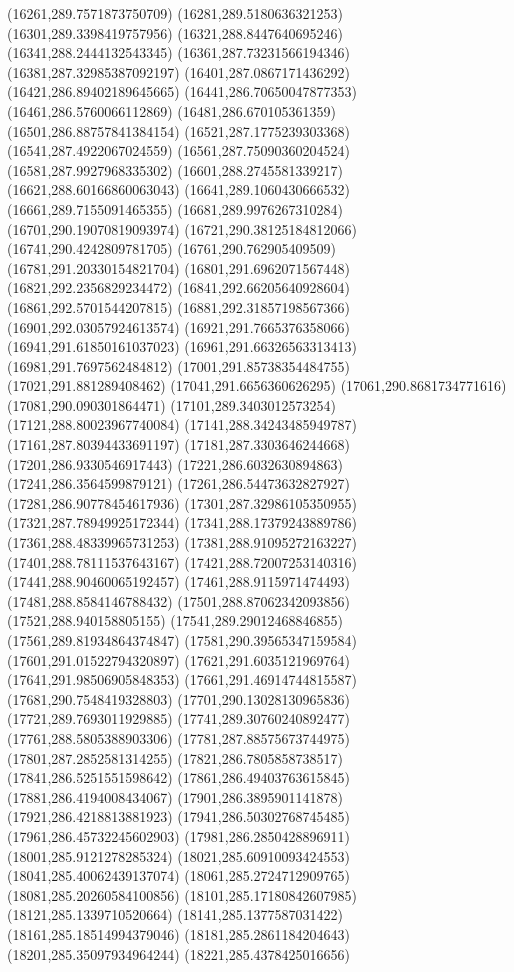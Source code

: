 {(16261,289.7571873750709)
(16281,289.5180636321253)
(16301,289.3398419757956)
(16321,288.8447640695246)
(16341,288.2444132543345)
(16361,287.73231566194346)
(16381,287.32985387092197)
(16401,287.0867171436292)
(16421,286.89402189645665)
(16441,286.70650047877353)
(16461,286.5760066112869)
(16481,286.670105361359)
(16501,286.88757841384154)
(16521,287.1775239303368)
(16541,287.4922067024559)
(16561,287.75090360204524)
(16581,287.9927968335302)
(16601,288.2745581339217)
(16621,288.60166860063043)
(16641,289.1060430666532)
(16661,289.7155091465355)
(16681,289.9976267310284)
(16701,290.19070819093974)
(16721,290.38125184812066)
(16741,290.4242809781705)
(16761,290.762905409509)
(16781,291.20330154821704)
(16801,291.6962071567448)
(16821,292.2356829234472)
(16841,292.66205640928604)
(16861,292.5701544207815)
(16881,292.31857198567366)
(16901,292.03057924613574)
(16921,291.7665376358066)
(16941,291.61850161037023)
(16961,291.66326563313413)
(16981,291.7697562484812)
(17001,291.85738354484755)
(17021,291.881289408462)
(17041,291.6656360626295)
(17061,290.8681734771616)
(17081,290.090301864471)
(17101,289.3403012573254)
(17121,288.80023967740084)
(17141,288.34243485949787)
(17161,287.80394433691197)
(17181,287.3303646244668)
(17201,286.9330546917443)
(17221,286.6032630894863)
(17241,286.3564599879121)
(17261,286.54473632827927)
(17281,286.90778454617936)
(17301,287.32986105350955)
(17321,287.78949925172344)
(17341,288.17379243889786)
(17361,288.48339965731253)
(17381,288.91095272163227)
(17401,288.78111537643167)
(17421,288.72007253140316)
(17441,288.90460065192457)
(17461,288.9115971474493)
(17481,288.8584146788432)
(17501,288.87062342093856)
(17521,288.940158805155)
(17541,289.29012468846855)
(17561,289.81934864374847)
(17581,290.39565347159584)
(17601,291.01522794320897)
(17621,291.6035121969764)
(17641,291.98506905848353)
(17661,291.46914744815587)
(17681,290.7548419328803)
(17701,290.13028130965836)
(17721,289.7693011929885)
(17741,289.30760240892477)
(17761,288.5805388903306)
(17781,287.88575673744975)
(17801,287.2852581314255)
(17821,286.7805858738517)
(17841,286.5251551598642)
(17861,286.49403763615845)
(17881,286.4194008434067)
(17901,286.3895901141878)
(17921,286.4218813881923)
(17941,286.50302768745485)
(17961,286.45732245602903)
(17981,286.2850428896911)
(18001,285.9121278285324)
(18021,285.60910093424553)
(18041,285.40062439137074)
(18061,285.2724712909765)
(18081,285.20260584100856)
(18101,285.17180842607985)
(18121,285.1339710520664)
(18141,285.1377587031422)
(18161,285.18514994379046)
(18181,285.2861184204643)
(18201,285.35097934964244)
(18221,285.4378425016656)
}
